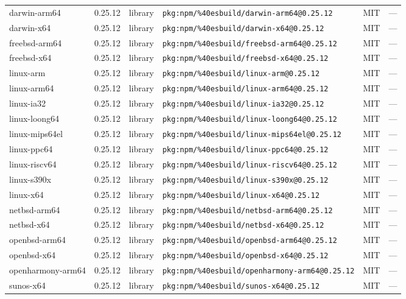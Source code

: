 \documentclass[11pt]{article}
\begin{document}
\begin{longtable}{|l|l|l|p{2.2cm}|l|p{4cm}|}
darwin-arm64 & 0.25.12 & library & \texttt{pkg:npm/\%40esbuild/darwin-arm64@0.25.12} & MIT & — \\
darwin-x64 & 0.25.12 & library & \texttt{pkg:npm/\%40esbuild/darwin-x64@0.25.12} & MIT & — \\
freebsd-arm64 & 0.25.12 & library & \texttt{pkg:npm/\%40esbuild/freebsd-arm64@0.25.12} & MIT & — \\
freebsd-x64 & 0.25.12 & library & \texttt{pkg:npm/\%40esbuild/freebsd-x64@0.25.12} & MIT & — \\
linux-arm & 0.25.12 & library & \texttt{pkg:npm/\%40esbuild/linux-arm@0.25.12} & MIT & — \\
linux-arm64 & 0.25.12 & library & \texttt{pkg:npm/\%40esbuild/linux-arm64@0.25.12} & MIT & — \\
linux-ia32 & 0.25.12 & library & \texttt{pkg:npm/\%40esbuild/linux-ia32@0.25.12} & MIT & — \\
linux-loong64 & 0.25.12 & library & \texttt{pkg:npm/\%40esbuild/linux-loong64@0.25.12} & MIT & — \\
linux-mips64el & 0.25.12 & library & \texttt{pkg:npm/\%40esbuild/linux-mips64el@0.25.12} & MIT & — \\
linux-ppc64 & 0.25.12 & library & \texttt{pkg:npm/\%40esbuild/linux-ppc64@0.25.12} & MIT & — \\
linux-riscv64 & 0.25.12 & library & \texttt{pkg:npm/\%40esbuild/linux-riscv64@0.25.12} & MIT & — \\
linux-s390x & 0.25.12 & library & \texttt{pkg:npm/\%40esbuild/linux-s390x@0.25.12} & MIT & — \\
linux-x64 & 0.25.12 & library & \texttt{pkg:npm/\%40esbuild/linux-x64@0.25.12} & MIT & — \\
netbsd-arm64 & 0.25.12 & library & \texttt{pkg:npm/\%40esbuild/netbsd-arm64@0.25.12} & MIT & — \\
netbsd-x64 & 0.25.12 & library & \texttt{pkg:npm/\%40esbuild/netbsd-x64@0.25.12} & MIT & — \\
openbsd-arm64 & 0.25.12 & library & \texttt{pkg:npm/\%40esbuild/openbsd-arm64@0.25.12} & MIT & — \\
openbsd-x64 & 0.25.12 & library & \texttt{pkg:npm/\%40esbuild/openbsd-x64@0.25.12} & MIT & — \\
openharmony-arm64 & 0.25.12 & library & \texttt{pkg:npm/\%40esbuild/openharmony-arm64@0.25.12} & MIT & — \\
sunos-x64 & 0.25.12 & library & \texttt{pkg:npm/\%40esbuild/sunos-x64@0.25.12} & MIT & — \\

\end{longtable}
\end{document}
